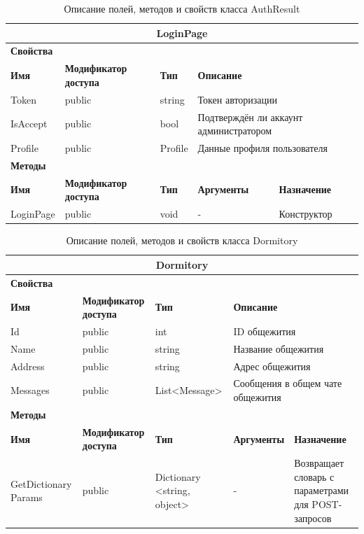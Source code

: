 \documentclass{../includes/TechDoc}
\begin{document}
    \begin{table}[ht]
        \caption{\label{tab:class-authresult-table}Описание полей, методов и свойств класса AuthResult}
        \centering
        \begin{tabular}{|l|p{3cm}|l|p{3cm}|p{5cm}|}
            \hline
            \multicolumn{5}{|c|}{LoginPage} \\ \hline
            \multicolumn{5}{|l|}{\textbf{Свойства}} \\ \hline
            \textbf{Имя} & \textbf{Модификатор доступа} & \textbf{Тип} & \multicolumn{2}{l|}{\textbf{Описание}} \\ \hline
            Token & public & string & \multicolumn{2}{l|}{Токен авторизации} \\ \hline
            IsAccept & public & bool & \multicolumn{2}{l|}{Подтверждён ли аккаунт администратором} \\ \hline
            Profile & public & Profile & \multicolumn{2}{l|}{Данные профиля пользователя} \\ \hline
            \multicolumn{5}{|l|}{\textbf{Методы}} \\ \hline
            \textbf{Имя} & \textbf{Модификатор доступа} & \textbf{Тип} & \textbf{Аргументы} & \textbf{Назначение} \\ \hline
            LoginPage & public & void & - & Конструктор \\ \hline
        \end{tabular}
    \end{table}

    \begin{table}[ht]
        \caption{\label{tab:class-dormitory-table}Описание полей, методов и свойств класса Dormitory}
        \centering
        \begin{tabular}{|p{3cm}|p{3cm}|p{3cm}|p{2.6cm}|p{4cm}|}
            \hline
            \multicolumn{5}{|c|}{Dormitory} \\ \hline
            \multicolumn{5}{|l|}{\textbf{Свойства}} \\ \hline
            \textbf{Имя} & \textbf{Модификатор доступа} & \textbf{Тип} & \multicolumn{2}{l|}{\textbf{Описание}} \\ \hline
            Id & public & int & \multicolumn{2}{l|}{ID общежития} \\ \hline
            Name & public & string & \multicolumn{2}{l|}{Название общежития} \\ \hline
            Address & public & string & \multicolumn{2}{l|}{Адрес общежития} \\ \hline
            Messages & public & List<Message> & \multicolumn{2}{p{7cm}|}{Сообщения в общем чате общежития} \\ \hline
            \multicolumn{5}{|l|}{\textbf{Методы}} \\ \hline
            \textbf{Имя} & \textbf{Модификатор доступа} & \textbf{Тип} & \textbf{Аргументы} & \textbf{Назначение} \\ \hline
            GetDictionary Params & public & Dictionary <string, object> & - & Возвращает словарь с параметрами для POST-запросов \\ \hline
        \end{tabular}
    \end{table}
\end{document}
